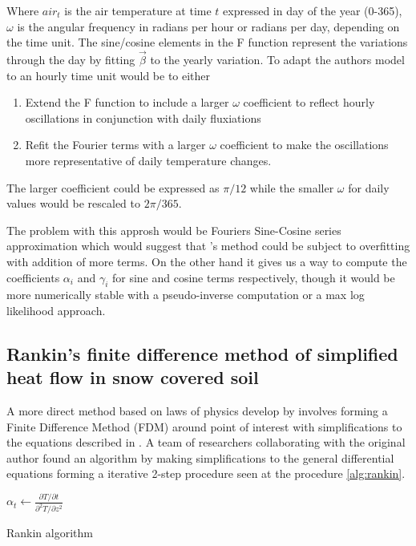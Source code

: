 Where $air_t$ is the air temperature at time $t$ expressed in day of the year (0-365), $\omega$ is the angular frequency in radians per hour or radians per day, depending on the time unit. The sine/cosine elements in the F function represent the variations through the day by fitting $\vec{\beta}$ to the yearly variation. To adapt the authors model to an hourly time unit would be to either
\begin{enumerate}
	\item Extend the F function to include a larger $\omega$ coefficient to reflect hourly oscillations in conjunction with daily fluxiations
	\item Refit the Fourier terms with a larger $\omega$ coefficient to make the oscillations more representative of daily temperature changes.
\end{enumerate}

The larger coefficient could be expressed as $\pi/12$ while the smaller $\omega$ for daily values would be rescaled to $2\pi/365$.

The problem with this approsh would be Fouriers Sine-Cosine series approximation which would suggest that \citeauthor{plauborg_simple_2002}'s method could be subject to overfitting with addition of more terms. On the other hand it gives us a way to compute the coefficients $\alpha_i$ and $\gamma_i$ for sine and cosine terms respectively, though it would be more numerically stable with a pseudo-inverse computation or a max log likelihood approach.

\subsection[Rankin algorithm]{Rankin's finite difference method of simplified heat flow in snow covered soil}\label{sec:theory:rankin}

A more direct method based on laws of physics develop by \citeauthor{karvonen_model_1988} involves forming a Finite Difference Method (FDM) around point of interest with simplifications to the equations described in . A team of researchers collaborating with the original author found an algorithm by making simplifications to the general differential equations forming a iterative 2-step procedure seen at the procedure \ref{alg:rankin}.

\begin{algorithm}[h]
	\SetAlgoLined
	$\alpha_t \gets \frac{\partial T / \partial t}{\partial^2 T / \partial z^2}$\;
	\caption{Rankin algorithm}
	\label{alg:rankin}
\end{algorithm}

